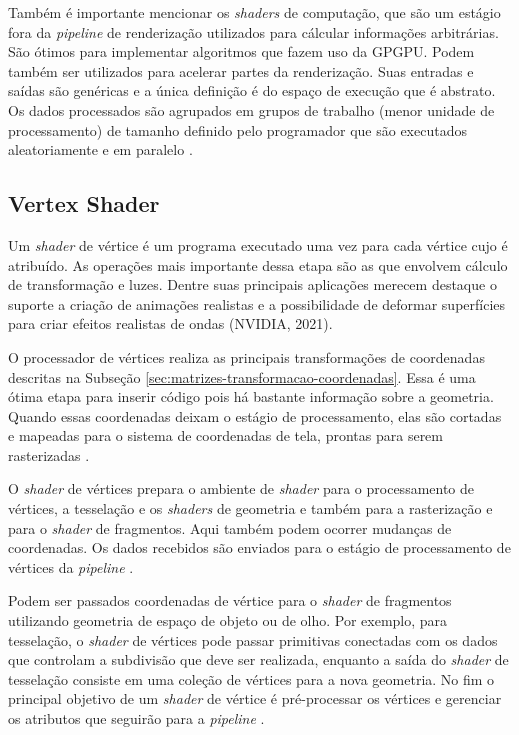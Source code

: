 Também é importante mencionar os \textit{shaders} de computação, que são um estágio fora da \textit{pipeline} de renderização utilizados para cálcular informações arbitrárias. São ótimos para implementar algoritmos que fazem uso da GPGPU. Podem também ser utilizados para acelerar partes da renderização. Suas entradas e saídas são genéricas e a única definição é do espaço de execução que é abstrato. Os dados processados são agrupados em grupos de trabalho (menor unidade de processamento) de tamanho definido pelo programador que são executados aleatoriamente e em paralelo \cite{hasu2018modern}.  

\subsection{Vertex Shader}
\label{vertex-shader}

Um \textit{shader} de vértice é um programa executado uma vez para cada vértice cujo é atribuído. As operações mais importante dessa etapa são as que envolvem cálculo de transformação e luzes. Dentre suas principais aplicações merecem destaque o suporte a criação de animações realistas e a possibilidade de deformar superfícies para criar efeitos realistas de ondas (NVIDIA, 2021)\nocite{vertexShader}.

O processador de vértices realiza as principais transformações de coordenadas descritas na Subseção \ref{sec:matrizes-transformacao-coordenadas}. Essa é uma ótima etapa para inserir código pois há bastante informação sobre a geometria. Quando essas coordenadas deixam o estágio de processamento, elas são cortadas e mapeadas para o sistema de coordenadas de tela, prontas para serem rasterizadas \cite{bailey2007}.

O \textit{shader} de vértices prepara o ambiente de \textit{shader} para o processamento de vértices, a tesselação e os \textit{shaders} de geometria e também para a rasterização e para o \textit{shader} de fragmentos. Aqui também podem ocorrer mudanças de coordenadas. Os dados recebidos são enviados para o estágio de processamento de vértices da \textit{pipeline} \cite{hasu2018modern}.

Podem ser passados coordenadas de vértice para o \textit{shader} de fragmentos utilizando geometria de espaço de objeto ou de olho. Por exemplo, para tesselação, o \textit{shader} de vértices pode passar primitivas conectadas com os dados que controlam a subdivisão que deve ser realizada, enquanto a saída do \textit{shader} de tesselação consiste em uma coleção de vértices para a nova geometria. No fim o principal objetivo de um \textit{shader} de vértice é pré-processar os vértices e gerenciar os atributos que seguirão para a \textit{pipeline} \cite{hasu2018modern}.

